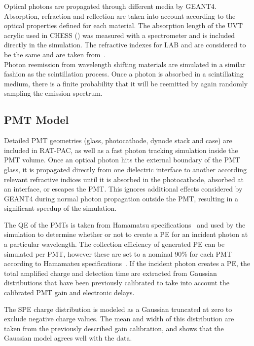 Optical photons are propagated through different media by GEANT4. 
Absorption, refraction and reflection are taken into account according to the optical properties defined for each material. 
The absorption length of the UVT acrylic used in CHESS () was measured with a spectrometer and is included directly in the simulation.  
The refractive indexes for LAB and {\labppo} are considered to be the same and are taken from~\cite{snop_private}. \\
Photon reemission from wavelength shifting materials are simulated in a similar fashion as the scintillation process. Once a photon is absorbed in a scintillating medium, there is a finite probability that it will be reemitted by again randomly sampling the emission spectrum.

\subsection{PMT Model \label{sec:pmt_model}}

Detailed PMT geometries (glass, photocathode, dynode stack and case) are included in RAT-PAC, as well as a fast photon tracking simulation inside the PMT volume. 
Once an optical photon hits the external boundary of the PMT glass, it is propagated directly from one dielectric interface to another according relevant refractive indices until it is absorbed in the photocathode, absorbed at an interface, or escapes the PMT.
This ignores additional effects considered by GEANT4 during normal photon propagation outside the PMT, resulting in a significant speedup of the simulation.

The QE of the PMTs is taken from Hamamatsu specifications~\cite{h11934} and used by the simulation to determine whether or not to create a PE for an incident photon at a particular wavelength. 
The collection efficiency of generated PE can be simulated per PMT, however these are set to a nominal 90\% for each PMT according to Hamamatsu specifications~\cite{hamamatsu}.  
If the incident photon creates a PE, the total amplified charge and detection time are extracted from Gaussian distributions that have been previously calibrated to take into account the calibrated PMT gain and electronic delays.

The SPE charge distribution is modeled as a Gaussian truncated at zero to exclude negative charge values. 
The mean and width of this distribution are taken from the previously described gain calibration, and  shows that the Gaussian model agrees well with the data.

